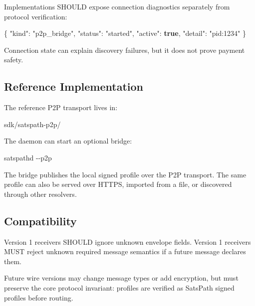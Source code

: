 \documentclass[
]{article}
\newenvironment{Shaded}{}{}
\newcommand{\DataTypeTok}[1]{\textcolor[rgb]{0.56,0.13,0.00}{#1}}
\newcommand{\FunctionTok}[1]{\textcolor[rgb]{0.02,0.16,0.49}{#1}}
\newcommand{\KeywordTok}[1]{\textcolor[rgb]{0.00,0.44,0.13}{\textbf{#1}}}
\newcommand{\NormalTok}[1]{#1}
\newcommand{\StringTok}[1]{\textcolor[rgb]{0.25,0.44,0.63}{#1}}
\begin{document}
Implementations SHOULD expose connection diagnostics separately from
protocol verification:

\begin{Shaded}
\begin{Highlighting}[]
\FunctionTok{\{}
  \DataTypeTok{"kind"}\FunctionTok{:} \StringTok{"p2p\_bridge"}\FunctionTok{,}
  \DataTypeTok{"status"}\FunctionTok{:} \StringTok{"started"}\FunctionTok{,}
  \DataTypeTok{"active"}\FunctionTok{:} \KeywordTok{true}\FunctionTok{,}
  \DataTypeTok{"detail"}\FunctionTok{:} \StringTok{"pid:1234"}
\FunctionTok{\}}
\end{Highlighting}
\end{Shaded}

Connection state can explain discovery failures, but it does not prove
payment safety.

\hypertarget{reference-implementation}{%
\subsection{Reference Implementation}\label{reference-implementation}}

The reference P2P transport lives in:

\begin{Shaded}
\begin{Highlighting}[]
\NormalTok{sdk/satspath{-}p2p/}
\end{Highlighting}
\end{Shaded}

The daemon can start an optional bridge:

\begin{Shaded}
\begin{Highlighting}[]
\NormalTok{satspathd {-}{-}p2p}
\end{Highlighting}
\end{Shaded}

The bridge publishes the local signed profile over the P2P transport.
The same profile can also be served over HTTPS, imported from a file, or
discovered through other resolvers.

\hypertarget{compatibility}{%
\subsection{Compatibility}\label{compatibility}}

Version 1 receivers SHOULD ignore unknown envelope fields. Version 1
receivers MUST reject unknown required message semantics if a future
message declares them.

Future wire versions may change message types or add encryption, but
must preserve the core protocol invariant: profiles are verified as
SatsPath signed profiles before routing.
\end{document}
